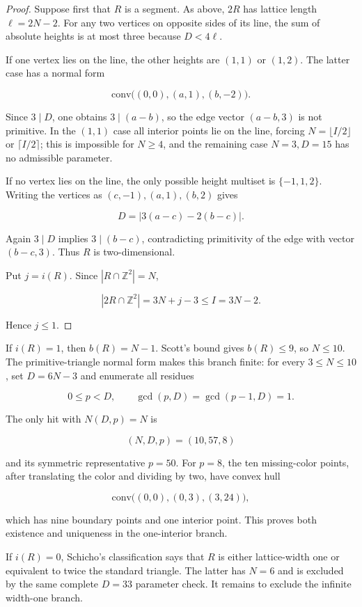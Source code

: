 \documentclass[11pt]{article}
\theoremstyle{remark}
\numberwithin{equation}{section}
\begin{document}
\begin{proof}

Suppose first that $R$ is a segment. As above, $2R$ has lattice length $\ell=2N-2$. For any two vertices on opposite sides of its line, the sum of absolute heights is at most three because $D<4\ell$.

If one vertex lies on the line, the other heights are $(1,1)$ or $(1,2)$. The latter case has a normal form

\[
\mathrm{conv}\bigl((0,0),(a,1),(b,-2)\bigr).
\]

Since $3\mid D$, one obtains $3\mid(a-b)$, so the edge vector $(a-b,3)$ is not primitive. In the $(1,1)$ case all interior points lie on the line, forcing $N=\lfloor I/2\rfloor$ or $\lceil I/2\rceil$; this is impossible for $N\ge4$, and the remaining case $N=3,D=15$ has no admissible parameter.

If no vertex lies on the line, the only possible height multiset is $\{-1,1,2\}$. Writing the vertices as $(c,-1),(a,1),(b,2)$ gives

\[
D=|3(a-c)-2(b-c)|.
\]

Again $3\mid D$ implies $3\mid(b-c)$, contradicting primitivity of the edge with vector $(b-c,3)$. Thus $R$ is two-dimensional.

Put $j=i(R)$. Since $|R\cap\mathbb Z^2|=N$,

\[
|2R\cap\mathbb Z^2|=3N+j-3\leq I=3N-2.
\]

Hence $j\le1$.
\end{proof}


If $i(R)=1$, then $b(R)=N-1$. Scott's bound \cite{ref10} gives $b(R)\le9$, so $N\le10$. The primitive-triangle normal form makes this branch finite: for every $3\le N\le10$, set $D=6N-3$ and enumerate all residues

\[
0\leq p<D,\qquad\gcd(p,D)=\gcd(p-1,D)=1.
\]

The only hit with $N(D,p)=N$ is

\[
(N,D,p)=(10,57,8)
\]

and its symmetric representative $p=50$. For $p=8$, the ten missing-color points, after translating the color and dividing by two, have convex hull

\[
\mathrm{conv}\bigl((0,0),(0,3),(3,24)\bigr),
\]

which has nine boundary points and one interior point. This proves both existence and uniqueness in the one-interior branch.

If $i(R)=0$, Schicho's classification \cite{ref9} says that $R$ is either lattice-width one or equivalent to twice the standard triangle. The latter has $N=6$ and is excluded by the same complete $D=33$ parameter check. It remains to exclude the infinite width-one branch.
\end{document}
